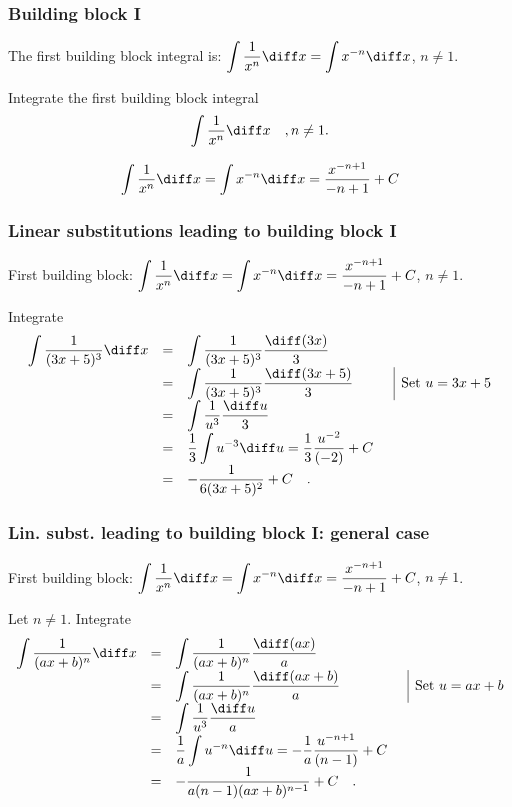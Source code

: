 \begin{frame}
\frametitle{Building block I}
The first building block integral is: $\displaystyle \int \frac{1}{x^n }\diff x=\int x^{-n}\diff x$, $n\neq 1$. 
\begin{example} Integrate the first building block integral 
\[
\int \frac{1}{x^n }\diff x\quad , n\neq 1.
\]

\[
\int \frac{1}{x^n}\diff x=\int x^{-n}\diff x = \frac{x^{-n+1}}{-n+1} +C
\]
\end{example}
\end{frame}
\begin{frame}
\frametitle{Linear substitutions leading to building block I}
First building block: $\displaystyle \int \frac{1}{x^n }\diff x=\int x^{-n}\diff x= \frac{x^{-n+1}}{-n+1} +C$, $n\neq 1$. 
\begin{example} Integrate 
\[
\begin{array}{rcll|l}
\displaystyle \int \frac{1}{(3x+5)^3 }\diff x&=&\displaystyle \int \frac{1}{(3x+5)^3 }\frac{\diff (3 x)}{3} \\
&=&\displaystyle \int \frac{1}{(3x+5)^3 }\frac{\diff (3 x+5)}{3} &&\text{Set }u=3x+5\\
&=&\displaystyle \int\frac{1}{u^3}\frac{\diff u}{3}\\
&=&\displaystyle \frac{1}{3}\int u^{-3} \diff u =\frac{1}{3} \frac{u^{-2}}{(-2)}+C\\
&=&\displaystyle -\frac{1}{6(3x+5)^2}+C\quad .
\end{array}
\]

\end{example}
\end{frame}
\begin{frame}
\frametitle{Lin. subst. leading to building block I: general case}
First building block: $\displaystyle \int \frac{1}{x^n }\diff x=\int x^{-n}\diff x= \frac{x^{-n+1}}{-n+1} +C$, $n\neq 1$. 
\begin{example} Let $n\neq 1$. Integrate 
\[
\begin{array}{rcll|l}
\displaystyle \int \frac{1}{(ax+b)^n }\diff x&=&\displaystyle \int \frac{1}{(ax+b)^n }\frac{\diff (a x)}{a} \\
&=&\displaystyle \int \frac{1}{(ax+b)^n }\frac{\diff (a x+b)}{a} &&\text{Set }u=ax+b\\
&=&\displaystyle \int\frac{1}{u^3}\frac{\diff u}{a}\\
&=&\displaystyle \frac{1}{a}\int u^{-n} \diff u =-\frac{1}{a} \frac{u^{-n+1}}{(n-1)}+C\\
&=&\displaystyle -\frac{1}{ a(n-1)(ax+b)^{n-1}}+C\quad .
\end{array}
\]

\end{example}
\end{frame}

